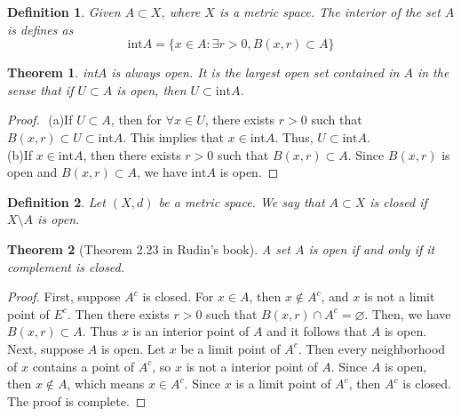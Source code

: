 \documentclass[12pt,leqno]{amsart}
\newtheorem{theorem}{Theorem}[section]
\newtheorem{definition}{Definition}[section]
\theoremstyle{definition}
\begin{document}
\medskip

\begin{definition}
Given $A\subset X$, where $X$ is a metric space. The interior of the set $A$ is defines as 
$$\text{int}A = \{x\in A: \exists r > 0, B(x,r)\subset A\}$$
\end{definition}

\medskip

\begin{theorem}
int$A$ is always open. It is the largest open set contained in $A$ in the sense that if $U\subset A$ is open, then $U \subset \text{int}A$.
\end{theorem}
\begin{proof}
$ $ \newline
\hspace*{1em}(a)If $U\subset A$, then for $\forall x\in U$, there exists $r>0$ such that $B(x,r)\subset U \subset \text{int}A$. This implies that $x\in \text{int}A$. Thus, $U\subset \text{int}A$. \\
\hspace*{1em}(b)If $x\in \text{int}A$, then there exists $r>0$ such that $B(x,r)\subset A$. Since $B(x,r)$ is open and $B(x,r)\subset A$, we have $\text{int}A$ is open.
\end{proof}

\begin{definition}
Let $(X,d)$ be a metric space. We say that $A\subset X$ is closed if $X\setminus A$ is open.
\end{definition}

\medskip

\begin{theorem}[Theorem 2.23 in Rudin's book]
A set $A$ is open if and only if it complement is closed.
\end{theorem}
\begin{proof}
First, suppose $A^c$ is closed. For $x\in A$, then $x\notin A^c$, and $x$ is not a limit point of $E^c$. Then there exists $r>0$ such that $B(x,r) \cap A^c = \varnothing$. Then, we have $B(x,r) \subset A$. Thus $x$ is an interior point of $A$ and it follows that $A$ is open.\\
\hspace*{3em}Next, suppose $A$ is open. Let $x$ be a limit point of $A^c$. Then every neighborhood of $x$ contains a point of $A^c$, so $x$ is not a interior point of $A$. Since $A$ is open, then $x\notin A$, which means $x\in A^c$. Since $x$ is a limit point of $A^c$, then $A^c$ is closed. The proof is complete.
\end{proof}
\end{document}
